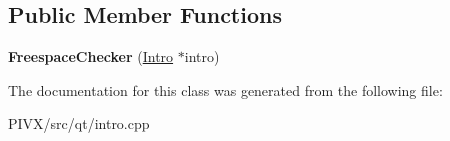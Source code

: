 \subsection*{Public Member Functions}
\begin{DoxyCompactItemize}
\item 
\mbox{\label{class_freespace_checker_a3b09323069e9e4306b4cdaed2852e0d8}} 
{\bfseries Freespace\+Checker} (\mbox{\hyperlink{class_intro}{Intro}} $\ast$intro)
\end{DoxyCompactItemize}


The documentation for this class was generated from the following file\+:\begin{DoxyCompactItemize}
\item 
P\+I\+V\+X/src/qt/intro.\+cpp\end{DoxyCompactItemize}
